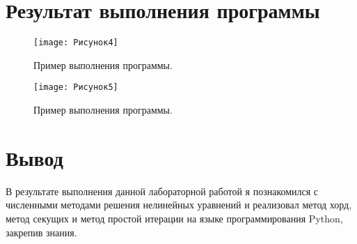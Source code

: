\documentclass[12pt]{report}
\begin{document}
	\section*{Результат выполнения программы}
	
	\begin{figure}[h]
		\texttt{[image: Рисунок4]}
		\label{fig:4}
		\caption{Пример выполнения программы.}
	\end{figure}
	
\begin{figure}[h]
	\texttt{[image: Рисунок5]}
	\caption{Пример выполнения программы.}
	\label{fig:6}
\end{figure}
	
	\section*{Вывод}
	В результате выполнения данной лабораторной работой я познакомился с численными методами решения нелинейных уравнений и реализовал метод хорд, метод секущих и метод простой итерации на языке программирования Python, закрепив знания.
\end{document}
